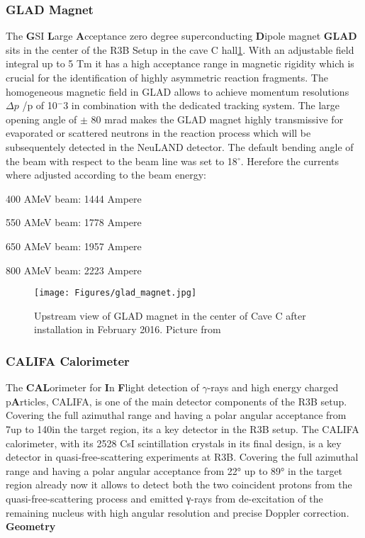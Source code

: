 \subsubsection{GLAD Magnet}
The \textbf{G}SI \textbf{L}arge \textbf{A}cceptance zero degree superconducting \textbf{D}ipole magnet \textbf{GLAD} sits in the center of the R3B Setup in the cave C hall\ref{fig:GLAD}. With an adjustable field integral up to 5 Tm it has a high acceptance range in magnetic rigidity which is crucial for the identification of highly asymmetric reaction fragments. The homogeneous magnetic field in GLAD allows to achieve momentum resolutions $\Delta p$ /p of 10$^-3$ in combination with the dedicated tracking system.\newline
The large opening angle of $\pm$ 80 mrad makes the GLAD magnet highly transmissive for evaporated or scattered neutrons in the reaction process which will be subsequentely detected in the NeuLAND detector.\newline
The default bending angle of the beam with respect to the beam line was set to 18$^{\circ}$. Herefore the currents where adjusted according to the beam energy:\newline
\newenvironment{tight_enumerate}{
\begin{enumerate}
  \setlength{\itemsep}{0pt}
  \setlength{\parskip}{0pt}
}{\end{enumerate}}
\begin{tight_enumerate}
\item 400 AMeV beam: 1444 Ampere
\item 550 AMeV beam: 1778 Ampere
\item 650 AMeV beam: 1957 Ampere
\item 800 AMeV beam: 2223 Ampere
\end{tight_enumerate}
\begin{figure}[htpb]
    \centering
    \texttt{[image: Figures/glad\_magnet.jpg]}
    \caption{
    Upstream view of GLAD magnet in the center of Cave C after installation in February 2016. Picture from \cite{wiki:GLAD} 
    }
    \label{fig:GLAD}
\end{figure}
\subsubsection{CALIFA Calorimeter}
The \textbf{CAL}orimeter for \textbf{I}n \textbf{F}light detection of $\gamma$-rays and high energy charged p\textbf{A}rticles, CALIFA, is one of the main detector components of the R3B setup. Covering the full azimuthal range and having a polar angular acceptance from 7\textdegree up to 140\textdegree in the target region, its a key detector in the R3B setup. 
The CALIFA calorimeter, with its 2528 CsI scintillation crystals in its final design, is a key detector
in quasi-free-scattering experiments at R3B. Covering the full azimuthal range and having a polar
angular acceptance from 22° up to 89° in the target region already now it allows to detect both the
two coincident protons from the quasi-free-scattering process and emitted γ-rays from de-excitation
of the remaining nucleus with high angular resolution and precise Doppler correction.
\textbf{Geometry}

